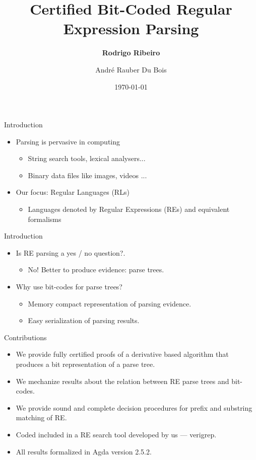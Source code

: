 \documentclass{beamer}
\title{Certified Bit-Coded Regular Expression Parsing}
\author{\textbf{Rodrigo Ribeiro}\inst{1} \and Andr\'e Rauber Du Bois\inst{2}}
\institute 
{
\inst{1} Departament of Computer Science\\
         Universidade Federal de Ouro Preto \\ $\,$ \\
\inst{2} Departament of Computer Science\\
         Universidade Federal de Pelotas
}
\date{\today}
\begin{document}
   \begin{frame}
      \titlepage 
   \end{frame}

   \begin{frame}{Introduction}
     \begin{itemize}
       \item Parsing is pervasive in computing
       \begin{itemize}
          \item String search tools, lexical analysers...
          \item Binary data files like images, videos ...
       \end{itemize}
       \item Our focus: Regular Languages (RLs)
       \begin{itemize}
         \item Languages denoted by Regular Expressions (REs) and
               equivalent formalisms
       \end{itemize}
     \end{itemize}
   \end{frame}

   \begin{frame}{Introduction}
     \begin{itemize}
       \item Is RE parsing a yes / no question?.
       \begin{itemize}
         \item No! Better to produce evidence: parse trees.
       \end{itemize}
       \item Why use bit-codes for parse trees?
       \begin{itemize}
         \item Memory compact representation of parsing evidence.
         \item Easy serialization of parsing results.
       \end{itemize}
     \end{itemize}
   \end{frame}

   \begin{frame}{Contributions}
     \begin{itemize}
       \item We provide fully certified proofs of a derivative based algorithm that
             produces a bit representation of a parse tree.
       \item We mechanize results about the relation between RE parse trees and
             bit-codes.
       \item We provide sound and complete decision procedures for prefix and substring
             matching of RE.
       \item Coded included in a RE search tool developed by us --- verigrep.
       \item All results formalized in Agda version 2.5.2.
     \end{itemize}
   \end{frame}
\end{document}
